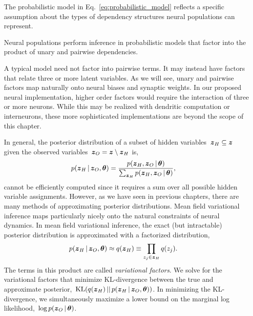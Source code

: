 The probabilistic model in Eq.~\ref{eq:probabilistic_model} reflects
a specific assumption about the types of dependency structures
neural populations can represent.

\begin{assumption}
  Neural populations perform inference in probabilistic models
  that factor into the product of unary and pairwise dependencies. 
\end{assumption}

A typical model need not factor into pairwise terms. It may instead
have factors that relate three or more latent variables. As we will
see, unary and pairwise factors map naturally onto neural biases
and synaptic weights. In our proposed neural implementation, higher
order factors would require the interaction of three or more neurons.
While this may be realized with dendritic computation or interneurons,
these more sophisticated implementations are beyond the scope of this
chapter. 

In general, the posterior distribution of a subset of hidden
variables~$\boldsymbol{z}_H \subseteq \boldsymbol{z}$ 
given the observed variables~$\boldsymbol{z}_O = \boldsymbol{z} \setminus \boldsymbol{z}_H$ is,
\begin{align}
  p(\boldsymbol{z}_H \,|\, \boldsymbol{z}_O, \boldsymbol{\theta}) &=
  \frac{p(\boldsymbol{z}_H, \boldsymbol{z}_O \,|\, \boldsymbol{\theta})}
       {\sum_{\boldsymbol{z}_H} p(\boldsymbol{z}_H, \boldsymbol{z}_O \,|\, \boldsymbol{\theta})},
\end{align}
cannot be efficiently computed since it requires a sum over all
possible hidden variable assignments.
However, as we have seen in previous chapters, there are many methods of
approximating posterior distributions. Mean field variational
inference  maps particularly nicely onto the natural constraints
of neural dynamics. 
In mean field variational inference, the exact (but intractable)
posterior distribution is approximated with a factorized
distribution,
\begin{align}
  p(\boldsymbol{z}_H \,|\, \boldsymbol{z}_O, \boldsymbol{\theta}) &\approx q(\boldsymbol{z}_H) \equiv \prod_{z_j \in \boldsymbol{z}_H} q(z_j).
\end{align}
The terms in this product are called \emph{variational factors}.  We
solve for the variational factors that minimize KL-divergence between
the true and approximate posterior,~$\mathrm{KL}(q(\boldsymbol{z}_H) \,||\, p(\boldsymbol{z}_H
\,|\, \boldsymbol{z}_O, \boldsymbol{\theta}))$. In minimizing the KL-divergence, we
simultaneously maximize a lower bound on the marginal log
likelihood,~$\log p(\boldsymbol{z}_O \,|\, \boldsymbol{\theta})$.

